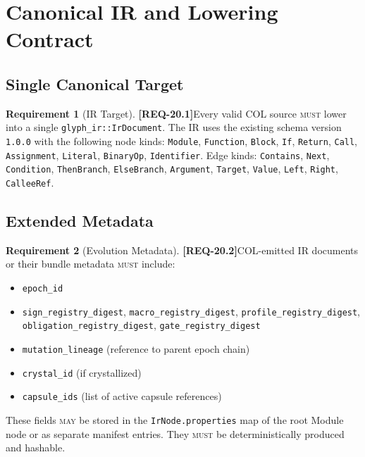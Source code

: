 \documentclass[11pt,a4paper,twoside]{article}
\theoremstyle{definition}
\newtheorem{requirement}{Requirement}[section]
\theoremstyle{remark}
\newcommand{\req}[1]{\textbf{\textcolor{reqred}{[REQ-#1]}}}
\newcommand{\must}{\textsc{must}}
\newcommand{\may}{\textsc{may}}
\begin{document}

\section{Canonical IR and Lowering Contract}
\label{sec:ir-contract}

\subsection{Single Canonical Target}

\begin{requirement}[IR Target]
\label{req:ir-target}
\req{20.1}\quad Every valid COL source \must{} lower into a single \texttt{glyph\_ir::IrDocument}. The IR uses the existing schema version \texttt{1.0.0} with the following node kinds: \texttt{Module}, \texttt{Function}, \texttt{Block}, \texttt{If}, \texttt{Return}, \texttt{Call}, \texttt{Assignment}, \texttt{Literal}, \texttt{BinaryOp}, \texttt{Identifier}. Edge kinds: \texttt{Contains}, \texttt{Next}, \texttt{Condition}, \texttt{ThenBranch}, \texttt{ElseBranch}, \texttt{Argument}, \texttt{Target}, \texttt{Value}, \texttt{Left}, \texttt{Right}, \texttt{CalleeRef}.
\end{requirement}

\subsection{Extended Metadata}

\begin{requirement}[Evolution Metadata]
\label{req:evolution-metadata}
\req{20.2}\quad COL-emitted IR documents or their bundle metadata \must{} include:
\begin{itemize}[nosep]
  \item \texttt{epoch\_id}
  \item \texttt{sign\_registry\_digest}, \texttt{macro\_registry\_digest}, \texttt{profile\_registry\_digest}, \texttt{obligation\_registry\_digest}, \texttt{gate\_registry\_digest}
  \item \texttt{mutation\_lineage} (reference to parent epoch chain)
  \item \texttt{crystal\_id} (if crystallized)
  \item \texttt{capsule\_ids} (list of active capsule references)
\end{itemize}
These fields \may{} be stored in the \texttt{IrNode.properties} map of the root Module node or as separate manifest entries. They \must{} be deterministically produced and hashable.
\end{requirement}
\end{document}
